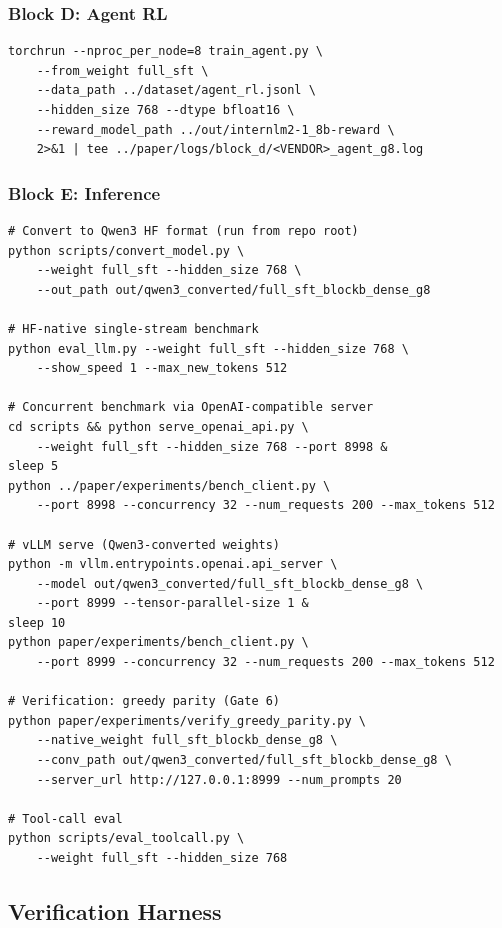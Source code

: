\subsubsection{Block D: Agent RL}

\begin{verbatim}
torchrun --nproc_per_node=8 train_agent.py \
    --from_weight full_sft \
    --data_path ../dataset/agent_rl.jsonl \
    --hidden_size 768 --dtype bfloat16 \
    --reward_model_path ../out/internlm2-1_8b-reward \
    2>&1 | tee ../paper/logs/block_d/<VENDOR>_agent_g8.log
\end{verbatim}

\subsubsection{Block E: Inference}

\begin{verbatim}
# Convert to Qwen3 HF format (run from repo root)
python scripts/convert_model.py \
    --weight full_sft --hidden_size 768 \
    --out_path out/qwen3_converted/full_sft_blockb_dense_g8

# HF-native single-stream benchmark
python eval_llm.py --weight full_sft --hidden_size 768 \
    --show_speed 1 --max_new_tokens 512

# Concurrent benchmark via OpenAI-compatible server
cd scripts && python serve_openai_api.py \
    --weight full_sft --hidden_size 768 --port 8998 &
sleep 5
python ../paper/experiments/bench_client.py \
    --port 8998 --concurrency 32 --num_requests 200 --max_tokens 512

# vLLM serve (Qwen3-converted weights)
python -m vllm.entrypoints.openai.api_server \
    --model out/qwen3_converted/full_sft_blockb_dense_g8 \
    --port 8999 --tensor-parallel-size 1 &
sleep 10
python paper/experiments/bench_client.py \
    --port 8999 --concurrency 32 --num_requests 200 --max_tokens 512

# Verification: greedy parity (Gate 6)
python paper/experiments/verify_greedy_parity.py \
    --native_weight full_sft_blockb_dense_g8 \
    --conv_path out/qwen3_converted/full_sft_blockb_dense_g8 \
    --server_url http://127.0.0.1:8999 --num_prompts 20

# Tool-call eval
python scripts/eval_toolcall.py \
    --weight full_sft --hidden_size 768
\end{verbatim}

\subsection{Verification Harness}
\label{sec:appendix:verify}

